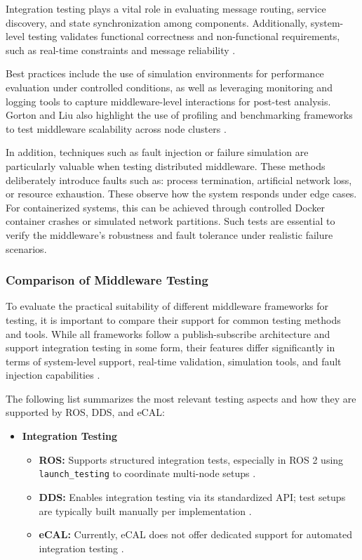 \vspace{1em}
{Integration testing plays a vital role in evaluating message routing, service discovery, and state synchronization among components. Additionally, system-level testing validates functional correctness and non-functional requirements, such as real-time constraints and message reliability \cite{gorton2006software}.

\vspace{1em}
Best practices include the use of simulation environments for performance evaluation under controlled conditions, as well as leveraging monitoring and logging tools to capture middleware-level interactions for post-test analysis. Gorton and Liu also highlight the use of profiling and benchmarking frameworks to test middleware scalability across node clusters \cite{gorton2006software}.

\vspace{1em}
In addition, techniques such as fault injection or failure simulation are particularly valuable when testing distributed middleware. These methods deliberately introduce faults such as: process termination, artificial network loss, or resource exhaustion. These observe how the system responds under edge cases. For containerized systems, this can be achieved through controlled Docker container crashes or simulated network partitions. Such tests are essential to verify the middleware's robustness and fault tolerance under realistic failure scenarios.

\subsubsection{Comparison of Middleware Testing}

To evaluate the practical suitability of different middleware frameworks for testing, it is important to compare their support for common testing methods and tools. While all frameworks follow a publish-subscribe architecture and support integration testing in some form, their features differ significantly in terms of system-level support, real-time validation, simulation tools, and fault injection capabilities \cite{gorton2006software, burns2009real}.

\vspace{1em}
The following list summarizes the most relevant testing aspects and how they are supported by ROS, DDS, and eCAL:

\begin{itemize}
	\item \textbf{Integration Testing}
	\begin{itemize}
		\item \textbf{ROS:} Supports structured integration tests, especially in ROS 2 using \texttt{launch\_testing} to coordinate multi-node setups \cite{ros2_launch_testing}.
		\item \textbf{DDS:} Enables integration testing via its standardized API; test setups are typically built manually per implementation \cite{pardo2003}.
		\item \textbf{eCAL:} Currently, eCAL does not offer dedicated support for automated integration testing \cite{ecal_official_docs}.
	\end{itemize}
	

\end{itemize}}
